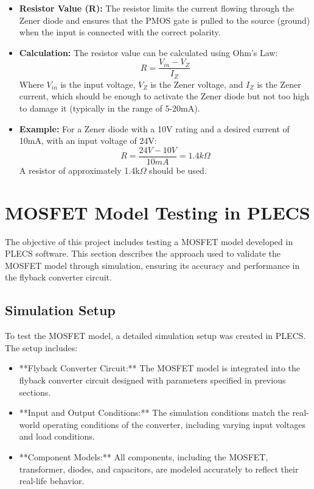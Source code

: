 \documentclass{article}
\begin{document}
\begin{itemize}
    \item \textbf{Resistor Value (R):} The resistor limits the current flowing through the Zener diode and ensures that the PMOS gate is pulled to the source (ground) when the input is connected with the correct polarity.
    
    \item \textbf{Calculation:} The resistor value can be calculated using Ohm's Law:
    \[
    R = \frac{V_{in} - V_{Z}}{I_{Z}}
    \]
    Where \(V_{in}\) is the input voltage, \(V_{Z}\) is the Zener voltage, and \(I_{Z}\) is the Zener current, which should be enough to activate the Zener diode but not too high to damage it (typically in the range of 5-20mA).
    
    \item \textbf{Example:} For a Zener diode with a 10V rating and a desired current of 10mA, with an input voltage of 24V:
    \[
    R = \frac{24V - 10V}{10mA} = 1.4k\Omega
    \]
    A resistor of approximately 1.4k\(\Omega\) should be used.
\end{itemize}


\section{MOSFET Model Testing in PLECS}

The objective of this project includes testing a MOSFET model developed in PLECS software. This section describes the approach used to validate the MOSFET model through simulation, ensuring its accuracy and performance in the flyback converter circuit.

\subsection{Simulation Setup}
To test the MOSFET model, a detailed simulation setup was created in PLECS. The setup includes:

\begin{itemize}
    \item **Flyback Converter Circuit:** The MOSFET model is integrated into the flyback converter circuit designed with parameters specified in previous sections.
    \item **Input and Output Conditions:** The simulation conditions match the real-world operating conditions of the converter, including varying input voltages and load conditions.
    \item **Component Models:** All components, including the MOSFET, transformer, diodes, and capacitors, are modeled accurately to reflect their real-life behavior.
\end{itemize}
\end{document}
